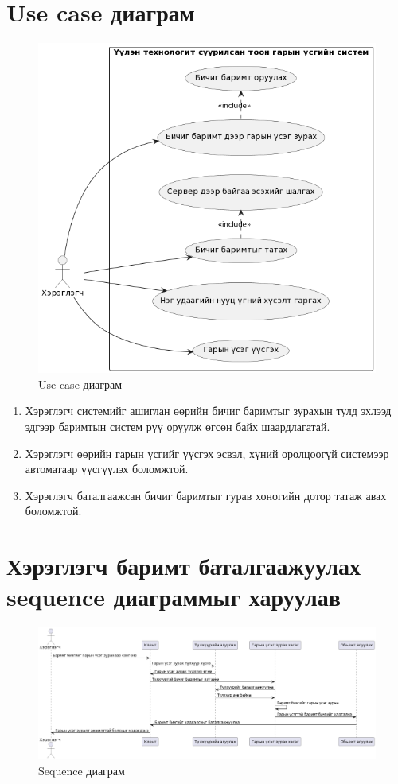 \section{Use case диаграм}
\begin{figure}[h]
	\centering
	\includegraphics[scale=0.66]{assets/usecase_mn.png}
	\caption{Use case диаграм}
	\label{fig:usecasemn}
\end{figure}
\begin{enumerate}
	\item Хэрэглэгч системийг ашиглан өөрийн бичиг баримтыг зурахын тулд эхлээд эдгээр баримтын систем рүү оруулж өгсөн байх шаардлагатай.
	\item Хэрэглэгч өөрийн гарын үсгийг үүсгэх эсвэл, хүний оролцоогүй системээр автоматаар үүсгүүлэх боломжтой.
	\item Хэрэглэгч баталгаажсан бичиг баримтыг гурав хоногийн дотор татаж авах боломжтой.
\end{enumerate}
\pagebreak
\section[Sequence диаграм]{Хэрэглэгч баримт баталгаажуулах sequence диаграммыг харуулав}
\begin{figure}[h!]
	\centering
	\includegraphics[scale=0.45, angle=90]{assets/sequence2.png}
	\caption{Sequence диаграм}
	\label{fig:usecasemn}
\end{figure}
\newpage
